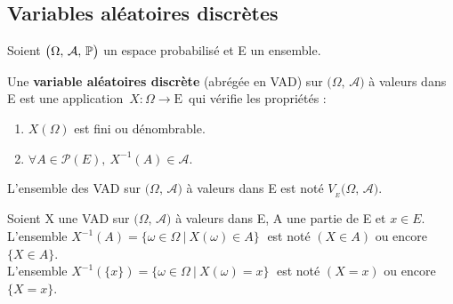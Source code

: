 \vspace{1cm}

\subsection{Variables aléatoires discrètes}
\vspace{0.5cm}
\begin{center}
    Soient \(\bigl(\Omega,\,\mathcal{A},\,\mathbb{P}\bigr)\) un espace probabilisé et E un ensemble.
\end{center}

\vspace{0.5cm}

Une \textbf{variable aléatoires discrète} (abrégée en VAD) sur \(\bigl(\Omega,\,\mathcal{A}\bigr)\) à valeurs dans E est une application \(\,X:\Omega \to \text{E}\,\) qui vérifie les propriétés :\vspace{0.1cm}
\begin{enumerate}[leftmargin=2cm]
    \item \(X(\Omega)\) est fini ou dénombrable.
    
    \item \(\forall A\in \mathcal{P}(E),\ X^{-1}(A)\in \mathcal{A}.\)
\end{enumerate}
\vspace{0.2cm}
\begin{small}
    \noindent L'ensemble des VAD sur \(\bigl(\Omega,\,\mathcal{A}\bigr)\) à valeurs dans E est noté \(V_{_E}\bigl(\Omega,\,\mathcal{A}\bigr).\)
\end{small}

\vspace{1.3cm}

Soient X une VAD sur \(\bigl(\Omega,\,\mathcal{A}\bigr)\) à valeurs dans E, A une partie de E et \(x\in E\).\vspace{0.1cm}\\
L'ensemble \(X^{-1}(A)=\{\omega\in \Omega \ \vert \ X(\omega)\in A\}\;\) est noté \((X\in A)\) ou encore \(\{X\in A\}\).\vspace{0.1cm}\\
L'ensemble \(X^{-1}(\{x\})=\{\omega\in \Omega \ \vert \ X(\omega)=x\}\;\) est noté \((X=x)\) ou encore \(\{X=x\}\).\\

